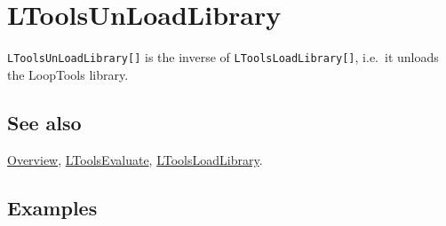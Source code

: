 \documentclass[../FeynHelpersManual.tex]{subfiles}
\begin{document}
\hypertarget{ltoolsunloadlibrary}{
\section{LToolsUnLoadLibrary}\label{ltoolsunloadlibrary}}

\texttt{LToolsUnLoadLibrary[\allowbreak{}]} is the inverse of
\texttt{LToolsLoadLibrary[\allowbreak{}]}, i.e.~it unloads the LoopTools
library.

\subsection{See also}

\hyperlink{toc}{Overview}, \hyperlink{ltoolsevaluate}{LToolsEvaluate},
\hyperlink{ltoolsloadlibrary}{LToolsLoadLibrary}.

\subsection{Examples}
\end{document}
